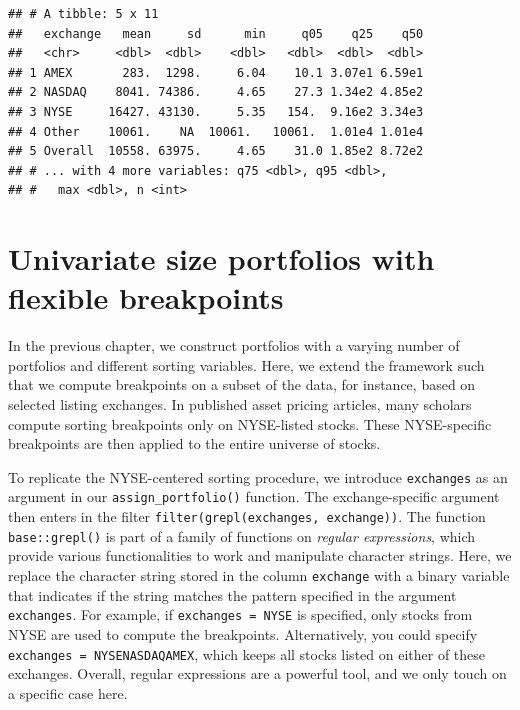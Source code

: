 \documentclass[
]{book}
\begin{document}
\begin{verbatim}
## # A tibble: 5 x 11
##   exchange   mean     sd      min     q05    q25    q50
##   <chr>     <dbl>  <dbl>    <dbl>   <dbl>  <dbl>  <dbl>
## 1 AMEX       283.  1298.     6.04    10.1 3.07e1 6.59e1
## 2 NASDAQ    8041. 74386.     4.65    27.3 1.34e2 4.85e2
## 3 NYSE     16427. 43130.     5.35   154.  9.16e2 3.34e3
## 4 Other    10061.    NA  10061.   10061.  1.01e4 1.01e4
## 5 Overall  10558. 63975.     4.65    31.0 1.85e2 8.72e2
## # ... with 4 more variables: q75 <dbl>, q95 <dbl>,
## #   max <dbl>, n <int>
\end{verbatim}

\hypertarget{univariate-size-portfolios-with-flexible-breakpoints}{%
\section{Univariate size portfolios with flexible breakpoints}\label{univariate-size-portfolios-with-flexible-breakpoints}}

In the previous chapter, we construct portfolios with a varying number of portfolios and different sorting variables. Here, we extend the framework such that we compute breakpoints on a subset of the data, for instance, based on selected listing exchanges. In published asset pricing articles, many scholars compute sorting breakpoints only on NYSE-listed stocks. These NYSE-specific breakpoints are then applied to the entire universe of stocks.

To replicate the NYSE-centered sorting procedure, we introduce \texttt{exchanges} as an argument in our \texttt{assign\_portfolio()} function. The exchange-specific argument then enters in the filter \texttt{filter(grepl(exchanges,\ exchange))}. The function \texttt{base::grepl()} is part of a family of functions on \emph{regular expressions}, which provide various functionalities to work and manipulate character strings. Here, we replace the character string stored in the column \texttt{exchange} with a binary variable that indicates if the string matches the pattern specified in the argument \texttt{exchanges}. For example, if \texttt{exchanges\ =\ \textquotesingle{}NYSE\textquotesingle{}} is specified, only stocks from NYSE are used to compute the breakpoints. Alternatively, you could specify \texttt{exchanges\ =\ \textquotesingle{}NYSE\textbar{}NASDAQ\textbar{}AMEX\textquotesingle{}}, which keeps all stocks listed on either of these exchanges. Overall, regular expressions are a powerful tool, and we only touch on a specific case here.
\end{document}
